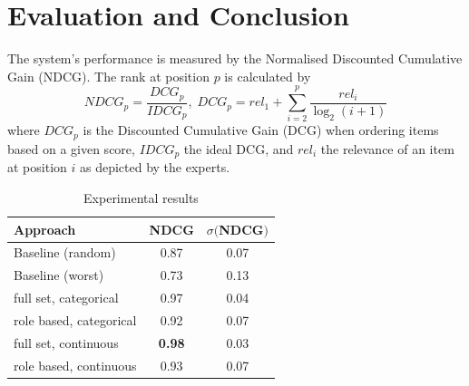 \section{Evaluation and Conclusion}
The system's performance is measured by the Normalised Discounted Cumulative Gain (NDCG). The rank at position $p$ is calculated by
\begin{equation}
NDCG_p = \frac{DCG_p}{IDCG_p},\;
DCG_p = rel_1 + \sum_{i=2}^{p} \frac{rel_i}{\log_2(i+1)}
\end{equation}
where $DCG_p$ is the Discounted Cumulative Gain (DCG) when ordering items based on a given score, $IDCG_p$ the ideal DCG, and $rel_i$ the relevance of an item at position $i$ as depicted by the experts.

\begin{table}
	\caption{Experimental results}
	\label{tab:freq}
	\begin{tabular}{lcc}
		\toprule
		Approach & NDCG & $\sigma ($NDCG$)$\\
		\midrule
		Baseline (random) & 0.87 & 0.07\\
		Baseline (worst) & 0.73 & 0.13\\
		\midrule
		full set, categorical & 0.97 & 0.04 \\
		role based, categorical & 0.92 & 0.07  \\
		full set, continuous & \textbf{0.98} & 0.03 \\
		role based, continuous & 0.93 & 0.07 \\
		\bottomrule
	\end{tabular}
\end{table}
%
